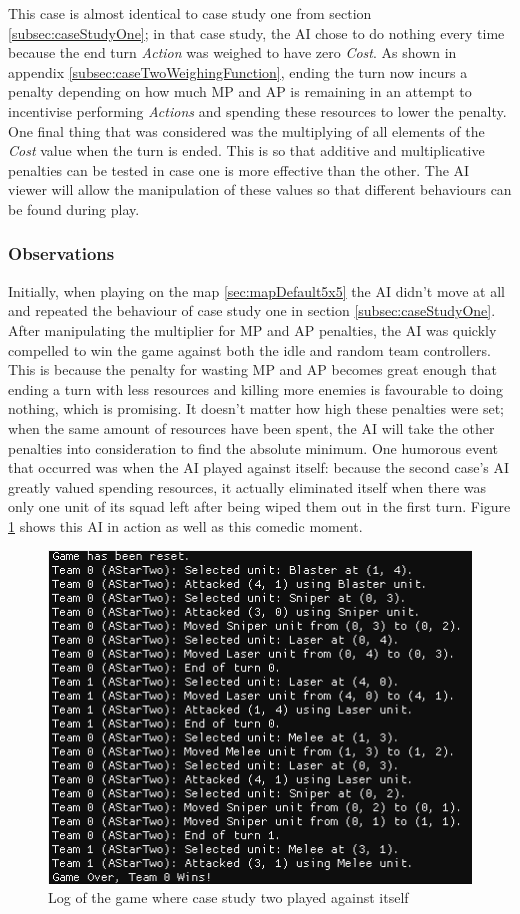 \documentclass[11pt, a4paper]{report}
\begin{document}
This case is almost identical to case study one from section \ref{subsec:caseStudyOne}; in that case study, the AI chose to do nothing every time because the end turn \emph{Action} was weighed to have zero \emph{Cost}. As shown in appendix \ref{subsec:caseTwoWeighingFunction}, ending the turn now incurs a penalty depending on how much MP and AP is remaining in an attempt to incentivise performing \emph{Actions} and spending these resources to lower the penalty. One final thing that was considered was the multiplying of all elements of the \emph{Cost} value when the turn is ended. This is so that additive and multiplicative penalties can be tested in case one is more effective than the other. The AI viewer will allow the manipulation of these values so that different behaviours can be found during play. 

\subsubsection{Observations}

Initially, when playing on the map \ref{sec:mapDefault5x5} the AI didn't move at all and repeated the behaviour of case study one in section \ref{subsec:caseStudyOne}. After manipulating the multiplier for MP and AP penalties, the AI was quickly compelled to win the game against both the idle and random team controllers. This is because the penalty for wasting MP and AP becomes great enough that ending a turn with less resources and killing more enemies is favourable to doing nothing, which is promising. It doesn't matter how high these penalties were set; when the same amount of resources have been spent, the AI will take the other penalties into consideration to find the absolute minimum. One humorous event that occurred was when the AI played against itself: because the second case's AI greatly valued spending resources, it actually eliminated itself when there was only one unit of its squad left after being wiped them out in the first turn. Figure \ref{fig:caseStudyTwoSuicide} shows this AI in action as well as this comedic moment.

\begin{figure}[!h]
  \centering
  \includegraphics[width=12cm]{img/case_two_suicide.png}
  \caption{Log of the game where case study two played against itself}
  \label{fig:caseStudyTwoSuicide}
\end{figure}
\end{document}
